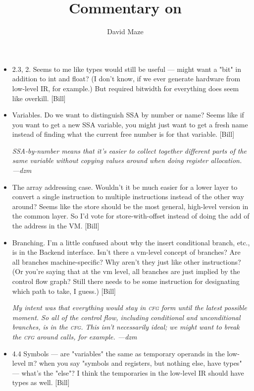 \documentclass[11pt]{article}
\title{Commentary on \stair}
\author{David Maze\\\dmazemail}
\def\cfg{\textsc{cfg}}
\def\ir{\textsc{ir}}
\begin{document}
\maketitle

\begin{itemize}
\item 2.3, 2. Seems to me like types would still be useful --- might
  want a "bit" in addition to int and float?  (I don't know, if we
  ever generate hardware from low-level IR, for example.) But required
  bitwidth for everything does seem like overkill.  [Bill]
  
\item Variables.  Do we want to distinguish SSA by number or name?
  Seems like if you want to get a new SSA variable, you might just
  want to get a fresh name instead of finding what the current free
  number is for that variable.  [Bill]

  \emph{SSA-by-number means that it's easier to collect together
    different parts of the same variable without copying values around
    when doing register allocation.  ---dzm}
  
\item The array addressing case.  Wouldn't it be much easier for a
  lower layer to convert a single instruction to multiple instructions
  instead of the other way around? Seems like the store should be the
  most general, high-level version in the common layer.  So I'd vote
  for store-with-offset instead of doing the add of the address in the
  VM.  [Bill]
  
\item Branching.  I'm a little confused about why the insert
  conditional branch, etc., is in the Backend interface.  Isn't there
  a vm-level concept of branches?  Are all branches machine-specific?
  Why aren't they just like other instructions?  (Or you're saying
  that at the vm level, all branches are just implied by the control
  flow graph?  Still there needs to be some instruction for
  designating which path to take, I guess.)  [Bill]
  
  \emph{My intent was that everything would stay in \cfg{} form until
    the latest possible moment.  So all of the control flow, including
    conditional and unconditional branches, is in the \cfg.  This
    isn't necessarily ideal; we might want to break the \cfg{} around
    calls, for example.  ---dzm}
  
\item 4.4 Symbols --- are "variables" the same as temporary operands
  in the low-level \ir?  when you say "symbols and registers, but
  nothing else, have types" --- what's the "else"?  I think the
  temporaries in the low-level IR should have types as well.  [Bill]
  

\end{itemize}
\end{document}
